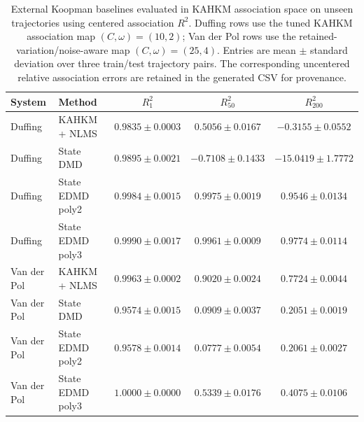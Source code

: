 \begin{table}[t]
\centering
\small
\caption{External Koopman baselines evaluated in KAHKM association space on unseen trajectories using centered association $R^2$. Duffing rows use the tuned KAHKM association map $(C,\omega)=(10,2)$; Van der Pol rows use the retained-variation/noise-aware map $(C,\omega)=(25,4)$. Entries are mean $\pm$ standard deviation over three train/test trajectory pairs. The corresponding uncentered relative association errors are retained in the generated CSV for provenance.}
\label{tab:external_baselines}
\begin{tabular}{llccc}
\toprule
System & Method & $R^2_1$ & $R^2_{50}$ & $R^2_{200}$ \\
\midrule
Duffing & KAHKM + NLMS & $0.9835\pm0.0003$ & $0.5056\pm0.0167$ & $-0.3155\pm0.0552$ \\
Duffing & State DMD & $0.9895\pm0.0021$ & $-0.7108\pm0.1433$ & $-15.0419\pm1.7772$ \\
Duffing & State EDMD poly2 & $0.9984\pm0.0015$ & $0.9975\pm0.0019$ & $0.9546\pm0.0134$ \\
Duffing & State EDMD poly3 & $0.9990\pm0.0017$ & $0.9961\pm0.0009$ & $0.9774\pm0.0114$ \\
\midrule
Van der Pol & KAHKM + NLMS & $0.9963\pm0.0002$ & $0.9020\pm0.0024$ & $0.7724\pm0.0044$ \\
Van der Pol & State DMD & $0.9574\pm0.0015$ & $0.0909\pm0.0037$ & $0.2051\pm0.0019$ \\
Van der Pol & State EDMD poly2 & $0.9578\pm0.0014$ & $0.0777\pm0.0054$ & $0.2061\pm0.0027$ \\
Van der Pol & State EDMD poly3 & $1.0000\pm0.0000$ & $0.5339\pm0.0176$ & $0.4075\pm0.0106$ \\
\bottomrule
\end{tabular}
\end{table}
